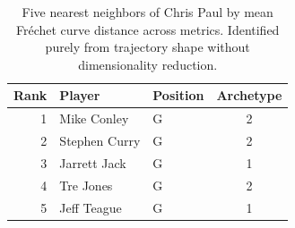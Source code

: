 \begin{table}[htbp]
  \centering\small
  \begin{tabular}{rllc}
    \toprule
    Rank & Player & Position & Archetype \\
    \midrule
    1 & Mike Conley & G & 2 \\
    2 & Stephen Curry & G & 2 \\
    3 & Jarrett Jack & G & 1 \\
    4 & Tre Jones & G & 2 \\
    5 & Jeff Teague & G & 1 \\
    \bottomrule
  \end{tabular}
  \caption{Five nearest neighbors of Chris Paul by mean Fr\'{e}chet curve distance across metrics. Identified purely from trajectory shape without dimensionality reduction.}
  \label{tab:Chris_Paul_frechet_curve_neighbors}
\end{table}

